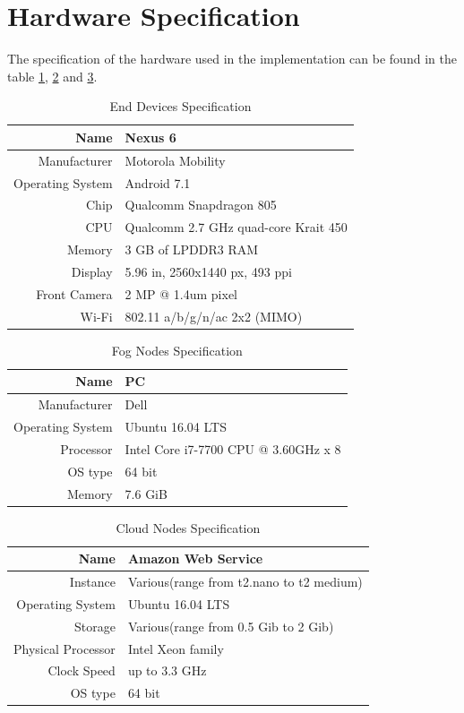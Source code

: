 \section{Hardware Specification}
The specification of the hardware used in the implementation can be found in the table \ref{table:end_devices_spec}, \ref{table:fog_nodes_spec} and \ref{table:cloud_nodes_spec}.

\begin{table}[ht]
\centering
\begin{tabular}{ |r|l| }
 \hline
Name &    Nexus 6\\
 \hline
Manufacturer &    Motorola Mobility\\
 \hline
Operating System &    Android 7.1\\
 \hline
Chip & Qualcomm Snapdragon 805\\
 \hline
CPU &    Qualcomm 2.7 GHz quad-core Krait 450\\
 \hline
Memory & 3 GB of LPDDR3 RAM \\
 \hline
Display & 5.96 in, 2560x1440 px, 493 ppi \\
 \hline
Front Camera & 2 MP @ 1.4um pixel \\
 \hline
Wi-Fi & 802.11 a/b/g/n/ac 2x2 (MIMO) \\
 \hline
\end{tabular}
\caption{End Devices Specification}
\label{table:end_devices_spec}
\end{table}

\begin{table}[ht]
\centering
\begin{tabular}{ |r|l| }
 \hline
Name &    PC \\
 \hline
Manufacturer &    Dell\\
 \hline
Operating System &    Ubuntu 16.04 LTS\\
 \hline
Processor & Intel Core i7-7700 CPU @ 3.60GHz x 8\\
 \hline
OS type & 64 bit\\
 \hline
Memory & 7.6 GiB\\
 \hline
\end{tabular}
\caption{Fog Nodes Specification}
\label{table:fog_nodes_spec}
\end{table}

\begin{table}[ht]
\centering
\begin{tabular}{ |r|l| }
 \hline
Name &    Amazon Web Service \\
 \hline
Instance & Various(range from t2.nano to t2 medium) \\
 \hline
Operating System &    Ubuntu 16.04 LTS\\
 \hline
Storage & Various(range from 0.5 Gib to 2 Gib)\\
 \hline
Physical Processor & Intel Xeon family\\
 \hline
Clock Speed & up to 3.3 GHz\\
 \hline
OS type & 64 bit\\
 \hline
\end{tabular}
\caption{Cloud Nodes Specification}
\label{table:cloud_nodes_spec}
\end{table}